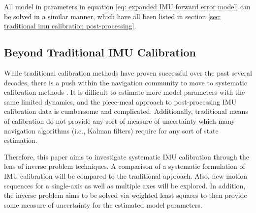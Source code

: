 All model in parameters in equation \ref{eq: expanded IMU forward error model} can be solved in a similar manner, which have all been listed in section \ref{sec: traditional imu calibration post-processing}.


\subsection{Beyond Traditional IMU Calibration}

While traditional calibration methods have proven successful over the past several decades, there is a push within the navigation community to move to systematic calibration methods \cite{ImprovedIMUCalibrationProcedures,Rahimi763,8943630,9851744,aCalibrationMethodForSixAccelerometerINS,s16060940}. It is difficult to estimate more model parameters with the same limited dynamics, and the piece-meal approach to post-processing IMU calibration data is cumbersome and complicated. Additionally, traditional means of calibration do not provide any sort of measure of uncertainty which many navigation algorithms (i.e., Kalman filters) require for any sort of state estimation.

Therefore, this paper aims to investigate systematic IMU calibration through the lens of inverse problem techniques. A comparison of a systematic formulation of IMU calibration will be compared to the traditional approach. Also, new motion sequences for a single-axis as well as multiple axes will be explored. In addition, the inverse problem aims to be solved via weighted least squares to then provide some measure of uncertainty for the estimated model parameters.

